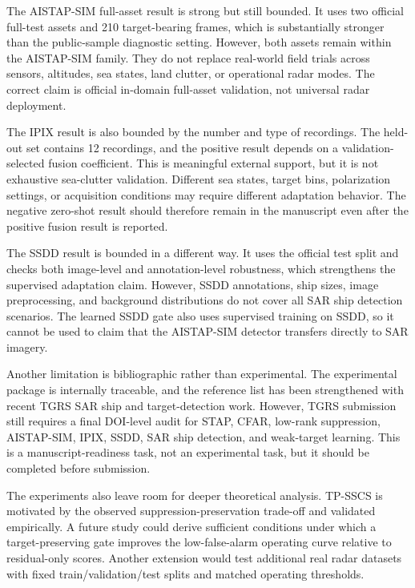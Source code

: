 \documentclass[journal]{IEEEtran}
\begin{document}
The AISTAP-SIM full-asset result is strong but still bounded. It uses two official full-test assets and 210 target-bearing frames, which is substantially stronger than the public-sample diagnostic setting. However, both assets remain within the AISTAP-SIM family. They do not replace real-world field trials across sensors, altitudes, sea states, land clutter, or operational radar modes. The correct claim is official in-domain full-asset validation, not universal radar deployment.

The IPIX result is also bounded by the number and type of recordings. The held-out set contains 12 recordings, and the positive result depends on a validation-selected fusion coefficient. This is meaningful external support, but it is not exhaustive sea-clutter validation. Different sea states, target bins, polarization settings, or acquisition conditions may require different adaptation behavior. The negative zero-shot result should therefore remain in the manuscript even after the positive fusion result is reported.

The SSDD result is bounded in a different way. It uses the official test split and checks both image-level and annotation-level robustness, which strengthens the supervised adaptation claim. However, SSDD annotations, ship sizes, image preprocessing, and background distributions do not cover all SAR ship detection scenarios. The learned SSDD gate also uses supervised training on SSDD, so it cannot be used to claim that the AISTAP-SIM detector transfers directly to SAR imagery.

Another limitation is bibliographic rather than experimental. The experimental package is internally traceable, and the reference list has been strengthened with recent TGRS SAR ship and target-detection work. However, TGRS submission still requires a final DOI-level audit for STAP, CFAR, low-rank suppression, AISTAP-SIM, IPIX, SSDD, SAR ship detection, and weak-target learning. This is a manuscript-readiness task, not an experimental task, but it should be completed before submission.

The experiments also leave room for deeper theoretical analysis. TP-SSCS is motivated by the observed suppression-preservation trade-off and validated empirically. A future study could derive sufficient conditions under which a target-preserving gate improves the low-false-alarm operating curve relative to residual-only scores. Another extension would test additional real radar datasets with fixed train/validation/test splits and matched operating thresholds.
\end{document}

